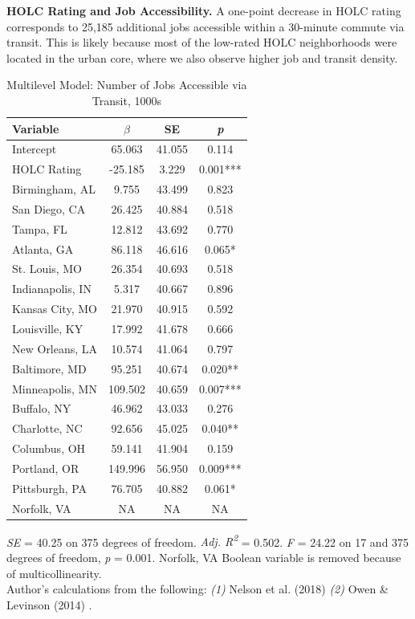 \documentclass[paper=letter, fontsize=12pt]{scrartcl} %
\begin{document}
	\begin{table}
		\textbf{HOLC Rating and Job Accessibility.} A one-point decrease in HOLC rating corresponds to 25,185 additional jobs accessible within a 30-minute commute via transit. This is likely because most of the low-rated HOLC neighborhoods were located in the urban core, where we also observe higher job and transit density.
		\caption{Multilevel Model: Number of Jobs Accessible via Transit, 1000s}
		\begin{center}
			\begin{tabular}{|| l | c c c ||}
				\hline
				Variable & $\beta$ & SE & \textit{p}\\
				\hline \hline
				Intercept & 65.063 & 41.055 & 0.114\\ 
				\hline 
				HOLC Rating & -25.185 & 3.229 & 0.001***\\ 
				\hline 
				Birmingham, AL & 9.755 & 43.499 & 0.823\\ 
				\hline 
				San Diego, CA & 26.425 & 40.884 & 0.518\\ 
				\hline 
				Tampa, FL & 12.812 & 43.692 & 0.770\\ 
				\hline 
				Atlanta, GA & 86.118 & 46.616 & 0.065*\\ 
				\hline 
				St. Louis, MO & 26.354 & 40.693 & 0.518\\ 
				\hline 
				Indianapolis, IN & 5.317 & 40.667 & 0.896\\ 
				\hline 
				Kansas City, MO & 21.970 & 40.915 & 0.592\\ 
				\hline 
				Louisville, KY & 17.992 & 41.678 & 0.666\\ 
				\hline 
				New Orleans, LA & 10.574 & 41.064 & 0.797\\ 
				\hline 
				Baltimore, MD & 95.251 & 40.674 & 0.020**\\ 
				\hline 
				Minneapolis, MN & 109.502 & 40.659 & 0.007***\\ 
				\hline 
				Buffalo, NY & 46.962 & 43.033 & 0.276\\ 
				\hline 
				Charlotte, NC & 92.656 & 45.025 & 0.040**\\ 
				\hline 
				Columbus, OH & 59.141 & 41.904 & 0.159\\ 
				\hline 
				Portland, OR & 149.996 & 56.950 & 0.009***\\ 
				\hline 
				Pittsburgh, PA & 76.705 & 40.882 & 0.061*\\ 
				\hline 
				Norfolk, VA & NA & NA & NA\\ 
				\hline 
			\end{tabular}
		\end{center}
		\textit{SE} = 40.25 on 375 degrees of freedom. \textit{Adj. R\textsuperscript{2}} = 0.502. \textit{F} = 24.22 on 17 and 375 degrees of freedom, \textit{p} = 0.001. Norfolk, VA Boolean variable is removed because of multicollinearity.\\
		Author's calculations from the following: \textit{(1)} Nelson et al. (2018) \cite{richmond} \textit{(2)} Owen \& Levinson (2014) \cite{owen}.
	\end{table}
	
\end{document}
